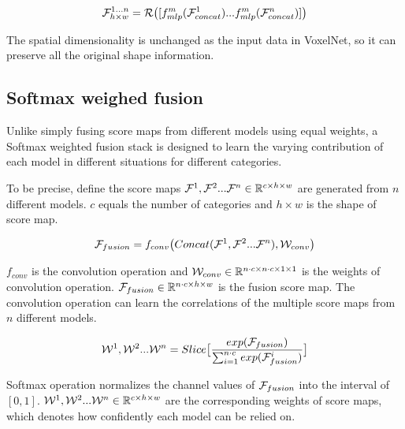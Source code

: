 \documentclass[letterpaper, 10 pt, conference]{ieeeconf}
\begin{document}
\begin{equation}
{\cal F}^{1...n}_{h \times w} = {\cal R} \big( [f_{mlp}^{m}({\cal F}^{1}_{concat}) ... f_{mlp}^{m}({\cal F}^{n}_{concat})] \big)
\label{eq:VoxelNet3}
\end{equation}

The spatial dimensionality is unchanged as the input data in VoxelNet, so it can preserve all the original shape information.
   
\subsection{Softmax weighed fusion}\label{sec:3.4}
Unlike simply fusing score maps from different models using equal weights, a Softmax weighted fusion stack is designed to learn the varying contribution of each model in different situations for different categories.    

To be precise, define the score maps ${\cal F}^{1}, {\cal F}^{2} ... {\cal F}^{n} \in \mathbb{R}^{c \times h \times w}$ are generated from $n$ different models. $c$ equals the number of categories and $ h \times w$ is the shape of score map. 

\begin{equation}
{\cal F}_{fusion} = f_{conv} \big( Concat( {\cal F}^{1}, {\cal F}^{2} ... {\cal F}^{n} ), {\cal W}_{conv} \big)
\label{eq:Softmax weighed fusion1}
\end{equation}

$f_{conv}$ is the convolution operation and $ {\cal W}_{conv} \in \mathbb{R}^{n \cdot c \times n \cdot c \times 1 \times 1} $ is the weights of convolution operation. ${\cal F}_{fusion} \in \mathbb{R}^{n \cdot c \times h \times w}$ is the fusion score map. The convolution operation can learn the correlations of the multiple score maps from $n$ different models.

\begin{equation}
{\cal W}^{1}, {\cal W}^{2}... {\cal W}^{n} = Slice \big[ \dfrac{exp( {\cal F}_{fusion} )}{ \sum_{i=1}^{n \cdot c} exp( {\cal F}_{fusion}^{i} )} \big] 
\label{eq:Softmax weighed fusion2}
\end{equation}

Softmax operation normalizes the channel values of ${\cal F}_{fusion}$ into the interval of $[0,1]$. ${\cal W}^{1}, {\cal W}^{2} ... {\cal W}^{n} \in \mathbb{R}^{c \times h \times w}$ are the corresponding weights of score maps, which denotes how confidently each model can be relied on.
\end{document}
